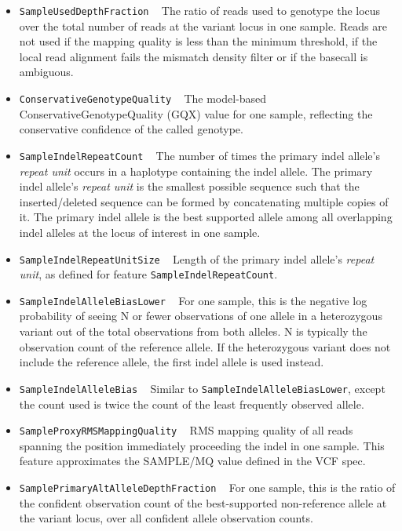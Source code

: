 \documentclass{article}
\begin{document}
\begin{itemize}
\item \texttt{SampleUsedDepthFraction} ~ The ratio of reads used to genotype the locus over the total number of reads at the variant locus in one sample. Reads are not used if the mapping quality is less than the minimum threshold, if the local read alignment fails the mismatch density filter or if the basecall is ambiguous.

\item \texttt{ConservativeGenotypeQuality} ~ The model-based ConservativeGenotypeQuality (GQX) value for one sample, reflecting the conservative confidence of the called genotype.

\item \texttt{SampleIndelRepeatCount} ~ The number of times the primary indel allele's \emph{repeat unit} occurs in a haplotype containing the indel allele. The primary indel allele's \emph{repeat unit} is the smallest possible sequence such that the inserted/deleted sequence can be formed by concatenating multiple copies of it. The primary indel allele is the best supported allele among all overlapping indel alleles at the locus of interest in one sample.

\item \texttt{SampleIndelRepeatUnitSize} ~ Length of the primary indel allele's \emph{repeat unit}, as defined for feature \texttt{SampleIndelRepeatCount}.

\item \texttt{SampleIndelAlleleBiasLower} ~ For one sample, this is the negative log probability of seeing N or fewer observations of one allele in a heterozygous variant out of the total observations from both alleles. N is typically the observation count of the reference allele. If the heterozygous variant does not include the reference allele, the first indel allele is used instead.

\item \texttt{SampleIndelAlleleBias} ~ Similar to \texttt{SampleIndelAlleleBiasLower}, except the count used is twice the count of the least frequently observed allele.

\item \texttt{SampleProxyRMSMappingQuality} ~ RMS mapping quality of all reads spanning the position immediately proceeding the indel in one sample. This feature approximates the SAMPLE/MQ value defined in the VCF spec.

\item \texttt{SamplePrimaryAltAlleleDepthFraction} ~ For one sample, this is the ratio of the confident observation count of the best-supported non-reference allele at the variant locus, over all confident allele observation counts.


\end{itemize}
\end{document}

